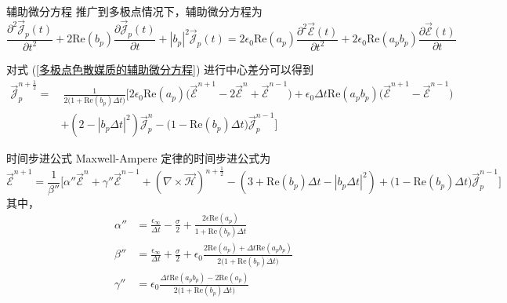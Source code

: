 \begin{theorem}{辅助微分方程}
    推广到多极点情况下，辅助微分方程为
    \begin{equation}
        \frac{\partial^2 \vec{\mathscr{J}}_p(t)}{\partial t^2}
        +2\text{Re}(b_p)\frac{\partial \vec{\mathscr{J}}_p(t)}{\partial t}
        +|b_p|^2 \vec{\mathscr{J}}_p(t)
        =2\epsilon_0 \text{Re}(a_p)
        \frac{\partial^2 \vec{\mathscr{E}}(t)}{\partial t^2}
        +2\epsilon_0 \text{Re}(a_pb_p) \frac{\partial \vec{\mathscr{E}}(t)}{\partial t}
        \label{多极点色散媒质的辅助微分方程}
    \end{equation}
\end{theorem}

\begin{lemma}
    对式 (\ref{多极点色散媒质的辅助微分方程}) 进行中心差分可以得到
    \begin{equation}
        \begin{aligned}
            \vec{\mathscr{J}}_p^{n+\frac{1}{2}}=&\ 
            \frac{1}{2\Big(1+\text{Re}(b_p)\Delta t\Big)}\Bigg[
                2\epsilon_0 \text{Re}(a_p)
                \Big(\vec{\mathscr{E}}^{n+1}-2\vec{\mathscr{E}}^{n}
                +\vec{\mathscr{E}}^{n-1}\Big)
                +\epsilon_0 \Delta t \text{Re}(a_pb_p)
                \Big(\vec{\mathscr{E}}^{n+1}-\vec{\mathscr{E}}^{n-1}\Big)\\
                &+\left(
                    2-\left|b_p\Delta t\right|^2
                \right)\vec{\mathscr{J}}_p^{n}
                -\Big(1-\text{Re}(b_p)\Delta t\Big)\vec{\mathscr{J}}_p^{n-1}
            \Bigg]
        \end{aligned}
    \end{equation}
\end{lemma}

\begin{theorem}{时间步进公式}
    Maxwell-Ampere 定律的时间步进公式为
    \begin{equation}
        \vec{\mathscr{E}}^{n+1}=
        \frac{1}{\beta''}\Bigg[
            \alpha'' \vec{\mathscr{E}}^{n}
            +\gamma''\vec{\mathscr{E}}^{n-1}
            +(\nabla \times \vec{\mathscr{H}})^{n+\frac{1}{2}}
            -\left(
                3+\text{Re}(b_p)\Delta t-\left|b_p\Delta t\right|^2
            \right)
            +\Big(1-\text{Re}(b_p)\Delta t\Big)\vec{\mathscr{J}}_p^{n-1}
        \Bigg]
    \end{equation}
    其中，
    \begin{align}
        \alpha''&=\frac{\epsilon_{\infty}}{\Delta t}
        -\frac{\sigma}{2}
        +\frac{2\epsilon\text{Re}(a_p)}{1+\text{Re}(b_p)\Delta t}\\
        \beta''&=\frac{\epsilon_{\infty}}{\Delta t}
        +\frac{\sigma}{2}
        +\epsilon_0 
        \frac{2\text{Re}(a_p)+\Delta t \text{Re}(a_pb_p)}
        {2\Big(1+\text{Re}(b_p)\Delta t\Big)}\\
        \gamma''&=
        \epsilon_0\frac{
            \Delta t \text{Re}(a_pb_p)
            -2\text{Re}(a_p)
        }{2\Big(1+\text{Re}(b_p)\Delta t\Big)}
    \end{align}
\end{theorem}